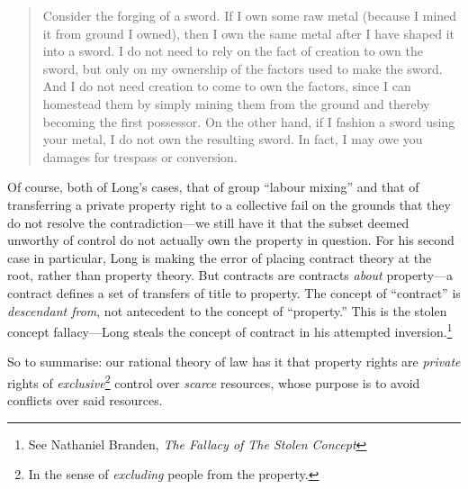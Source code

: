 \documentclass[11pt]{article}
\begin{document}
\begin{quote}
Consider the forging of a sword. If I own some raw metal (because I mined it from ground I owned), then I own the same metal after I have shaped it into a sword. I do not need to rely on the fact of creation to own the sword, but only on my ownership of the factors used to make the sword. And I do not need creation to come to own the factors, since I can homestead them by simply mining them from the ground and thereby becoming the first possessor. On the other hand, if I fashion a sword using your metal, I do not own the resulting sword. In fact, I may owe you damages for trespass or conversion.
\end{quote}

Of course, both of Long's cases, that of group ``labour mixing'' and that of transferring a private property right to a collective fail on the grounds that they do not resolve the contradiction---we still have it that the subset deemed unworthy of control do not actually own the property in question. For his second case in particular, Long is making the error of placing contract theory at the root, rather than property theory. But contracts are contracts \emph{about} property---a contract defines a set of transfers of title to property. The concept of ``contract'' is \emph{descendant from}, not antecedent to the concept of ``property.'' This is the stolen concept fallacy---Long steals the concept of contract in his attempted inversion.\footnote{See Nathaniel Branden, \emph{The Fallacy of The Stolen Concept}}

So to summarise: our rational theory of law has it that property rights are \emph{private} rights of \emph{exclusive}\footnote{In the sense of \emph{excluding} people from the property.} control over \emph{scarce} resources, whose purpose is to avoid conflicts over said resources.
\end{document}
